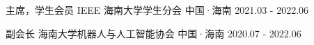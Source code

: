 

\begin{cventries}
\cventry
{主席，学生会员} %
{IEEE 海南大学学生分会} %
{中国·海南} %
{2021.03 - 2022.06} %
{
}


\cventry
{副会长} %
{海南大学机器人与人工智能协会} %
{中国·海南} %
{2020.07 - 2022.06} %
{
}


\end{cventries}
